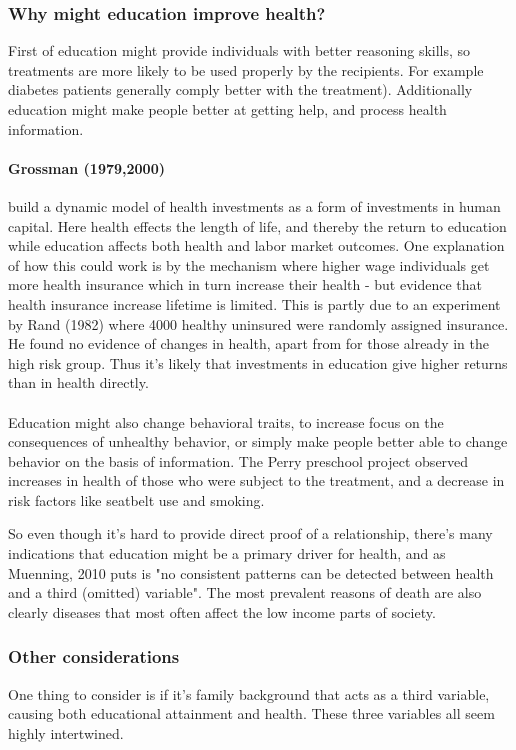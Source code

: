 \documentclass[12pt, a4paper]{article}
\begin{document}
\begin{multicols}{2}
\subsubsection{Why might education improve health?}
First of education might provide individuals with better reasoning skills, so treatments are more likely to be used properly by the recipients. For example diabetes patients generally comply better with the treatment). Additionally education might make people better at getting help, and process health information.

\paragraph{Grossman (1979,2000)} build a dynamic model of health investments as a form of investments in human capital. Here health effects the length of life, and thereby the return to education while education affects both health and labor market outcomes. One explanation of how this could work is by the mechanism where higher wage individuals get more health insurance which in turn increase their health - but evidence that health insurance increase lifetime is limited. This is partly due to an experiment by Rand (1982) where 4000 healthy uninsured were randomly assigned insurance. He found no evidence of changes in health, apart from for those already in the high risk group. Thus it's likely that investments in education give higher returns than in health directly. 
\\ \\
Education might also change behavioral traits, to increase focus on the consequences of unhealthy behavior, or simply make people better able to change behavior on the basis of information. The Perry preschool project observed increases in health of those who were subject to the treatment, and a decrease in risk factors like seatbelt use and smoking.

So even though it's hard to provide direct proof of a relationship, there's many indications that education might be a primary driver for health, and as Muenning, 2010 puts is "no consistent patterns can be detected between health and a third (omitted) variable". The most prevalent reasons of death are also clearly diseases that most often affect the low income parts of society.

\subsubsection{Other considerations}
One thing to consider is if it's family background that acts as a third variable, causing both educational attainment and health. These three variables all seem highly intertwined.


\end{multicols}
\end{document}
